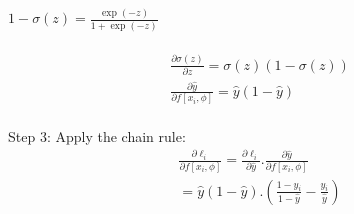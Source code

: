 \documentclass[10pt]{article}
\begin{document}
$1 - \sigma(z) = \frac{\exp(-z)}{1 + \exp(-z)}$ \\ \\
\begin{align*}
    \frac{\partial \sigma(z)}{\partial z}  = \sigma(z)(1 - \sigma(z)) \\ 
    \frac{\partial \hat{y}}{\partial f[x_i, \phi]} = \hat{y}(1 - \hat{y})
\end{align*} \\ 
Step 3: Apply the chain rule:
\begin{align*}
    \frac{\partial \ell_i}{\partial f[x_i, \phi]} = \frac{\partial \ell_i}{\partial \hat{y}} . \frac{\partial \hat{y}}{\partial f[x_i, \phi]} \\
    = \hat{y}(1 - \hat{y}) . \left( \frac{1-y_{i}}{1 - \hat{y}} -\frac{y_{i}}{\hat{y}} \right)
\end{align*}

\vspace{5em}
\end{document}
